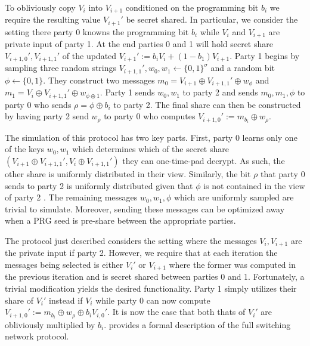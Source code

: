 To obliviously copy $V_i$ into $V_{i+1}$ conditioned on the programming bit $b_i$ we require the resulting value $V_{i+1}'$ be secret shared. In particular, we consider the setting there party 0 knowns the programming bit $b_i$ while $V_i$ and $V_{i+1}$ are private input of party 1. At the end parties 0 and 1 will hold secret share $V_{i+1,0}', V_{i+1,1}'$ of the updated $V_{i+1}':=b_i V_i + (1-b_1)V_{i+1}$. Party 1 begins by sampling three random strings $V_{i+1,1}', w_0,w_1\gets \{0,1\}^\sigma$ and a random bit $\phi\gets \{0,1\}$. They construct two messages $m_0=V_{i+1}\oplus V_{i+1,1}'\oplus w_\phi$ and $m_1= V_i\oplus V_{i+1,1}'\oplus w_{\phi\oplus 1}$. Party 1 sends $w_0,w_1$ to party 2 and sends $m_0,m_1,\phi$ to party 0 who sends $\rho=\phi\oplus b_i$ to party 2. The final share can then be constructed by having party 2 send $w_\rho$ to party 0 who computes $V_{i+1,0}':=m_{b_i}\oplus w_{\rho}$.

The simulation of this protocol has two key parts. First, party 0 learns only one of the keys $w_0,w_1$ which determines which of the secret share $(V_{i+1}\oplus V_{i+1,1}',  V_i\oplus V_{i+1,1}')$ they can one-time-pad decrypt. As such, the other share is uniformly distributed in their view. Similarly, the bit $\rho$ that party 0 sends to party 2 is uniformly distributed given that $\phi$ is not contained in the view of party 2 . The remaining messages $w_0,w_1,\phi$ which are uniformly sampled are trivial to simulate. Moreover, sending these messages can be optimized away when a PRG seed is pre-share between the appropriate parties.

The protocol just described considers the setting where the messages $V_i,V_{i+1}$ are the private input if party 2. However, we require that at each iteration the messages being selected is either $V_i'$ or $V_{i+1}$ where the former was computed in the previous iteration and is secret shared between parties 0 and 1. Fortunately, a trivial modification yields the desired functionality. Party 1 simply utilizes their share of $V_i'$ instead if $V_i$ while party 0 can now compute $V_{i+1,0}':=m_{b_i}\oplus w_{\rho}\oplus b_iV_{i,0}'$. It is now the case that both thats of $V_i'$ are obliviously multiplied by $b_i$.  provides a formal description of the full switching network protocol.

